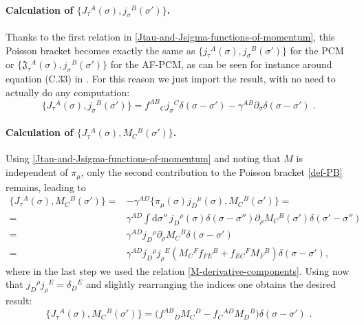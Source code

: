 \documentclass[12pt]{article}
\numberwithin{equation}{section}
\begin{document}
\paragraph{Calculation of $\{ J_{\tau}{}^{A}(\sigma),j_{\sigma}{}^{B}(\sigma') \}$.} Thanks to the first relation in \eqref{Jtau-and-Jsigma-functions-of-momentum}, this Poisson bracket becomes exactly the same as $\{ j_{\tau}{}^{A}(\sigma),j_{\sigma}{}^{B}(\sigma') \}$ for the PCM or $\{ \mathfrak{J}_{\tau}{}^{A}(\sigma),j_{\sigma}{}^{B}(\sigma') \}$ for the AF-PCM, as can be seen for instance around equation (C.33) in \cite{Bielli:2024ach}. For this reason we just import the result, with no need to actually do any computation:
\begin{equation}\label{YB-Jtau-jsigma-bracket}
\{ J_{\tau}{}^{A}(\sigma),j_{\sigma}{}^{B}(\sigma') \} = f^{AB}{}_{C}j_{\sigma}{}^{C}\delta(\sigma-\sigma')-\gamma^{AB}\partial_{\sigma}\delta(\sigma-\sigma') \,\, .
\end{equation}



\paragraph{Calculation of $\{ J_{\tau}{}^{A}(\sigma),M_{C}{}^{B}(\sigma') \}$.} Using \eqref{Jtau-and-Jsigma-functions-of-momentum} and noting that $M$ is independent of $\pi_{\mu}$, only the second contribution to the Poisson bracket \eqref{def-PB} remains, leading to
\begin{equation}
\begin{aligned}
\{ J_{\tau}{}^{A}(\sigma),M_{C}{}^{B}(\sigma') \}=&-\gamma^{AD}\{ \pi_{\mu}(\sigma)j_{D}{}^{\mu}(\sigma),M_{C}{}^{B}(\sigma') \}=
\\
=&\gamma^{AD}\int \mathrm{d}\sigma'' \, j_{D}{}^{\rho}(\sigma) \delta(\sigma-\sigma'') \partial_{\rho}M_{C}{}^{B}(\sigma')\delta(\sigma'-\sigma'')
\\
=&\gamma^{AD}j_{D}{}^{\rho}\partial_{\rho}M_{C}{}^{B} \delta(\sigma-\sigma')
\\
=&\gamma^{AD}j_{D}{}^{\rho}j_{\rho}{}^{E}(M_{C}{}^{F}f_{FE}{}^{B}+f_{EC}{}^{F}M_{F}{}^{B})\delta(\sigma-\sigma'),
\end{aligned}
\end{equation}
where in the last step we used the relation \eqref{M-derivative-components}. Using now that $j_{D}{}^{\rho}j_{\rho}{}^{E}=\delta_{D}{}^{E}$ and slightly rearranging the indices one obtains the desired result:
\begin{equation}\label{YB-Jtau-M-bracket}
\{ J_{\tau}{}^{A}(\sigma),M_{C}{}^{B}(\sigma') \} = \bigl(f^{AB}{}_{D}M_{C}{}^{D}-f_{C}{}^{AD}M_{D}{}^{B}\bigr)\delta(\sigma-\sigma') \,\, . 
\end{equation}
\end{document}
